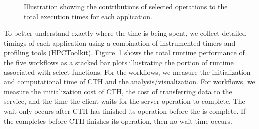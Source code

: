 
\begin{figure}[htbp]
\begin{centering}
\vspace{-24pt}

\vspace{-24pt}

\vspace{-24pt}

\caption[Breakdown of operation timings.]{Illustration showing the
contributions of selected operations to the total execution times for each
application.}
\label{fig:runtime-individual-bar}
\end{centering}
\end{figure}


To better understand exactly where the time is being spent, we collect
detailed timings of each application using a combination of instrumented timers
and profiling tools (HPCToolkit).  Figure~\ref{fig:runtime-individual-bar} shows
the total runtime performance of the five workflows as a stacked bar plots
illustrating the portion of runtime associated with select functions.  For the
\insitu workflows, we measure the initialization and computational time of
CTH and the analysis/visualization.  For \intransit workflows, we measure
the initialization cost of CTH, the cost of transferring data to the service,
and the time the client waits for the server operation to complete. The wait
only occurs after CTH has finished its operation before the \vda is
complete.  If the \vda completes before CTH finishes its operation, then no
wait time occurs.

